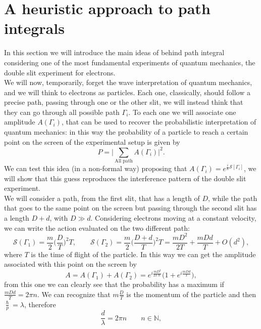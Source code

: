\section{A heuristic approach to path integrals}
In this section we will introduce the main ideas of behind path integral considering one of the most fundamental experiments of quantum mechanics, the double slit experiment for electrons.\\
We will now, temporarily, forget the wave interpretation of quantum mechanics, and we will think to electrons as particles. Each one, classically, should follow a precise path, passing through one or the other slit, we will instead think that they can go through all possible path $\Gamma_i$. To each one we will associate one amplitude $A(\Gamma_i)$, that can be used to recover the probabilistic interpretation of quantum mechanics: in this way the probability of a particle to reach a certain point on the screen of the experimental setup is given by 
\begin{equation*}
    P=\bigg|\sum_{\text{All path}}A(\Gamma_i)\bigg|^2.
\end{equation*}
We can test this idea (in a non-formal way) proposing that $A(\Gamma_i)=e^{\frac{i}{\hslash}\mathcal{S}[\Gamma_i]}$, we will show that this guess reproduces the interference pattern of the double slit experiment.\\
We will consider a path, from the first slit, that has a length of $D$, while the path that goes to the same point on the screen but passing through the second slit has a length $D+d$, with $D\gg d$. Considering electrons moving at a constant velocity, we can write the action evaluated on the two different path:
\begin{equation*}
    \mathcal{S} (\Gamma_1)=\frac{m}{2}\bigg(\frac{D}{T}\bigg)^2T,\qquad\mathcal{S} (\Gamma_2)=\frac{m}{2}\bigg(\frac{D+d}{T}\bigg)^2T=\frac{mD^2}{2T}+\frac{mDd}{T}+O(d^2),
\end{equation*}
where $T$ is the time of flight of the particle. In this way we can get the amplitude associated with this point on the screen by
\begin{equation*}
    A=A(\Gamma_1)+A(\Gamma_2)=e^{i\frac{mD^2}{2T\hslash}}\bigg(1+e^{i\frac{mDd}{T}}\bigg),
\end{equation*}
from this one we can clearly see that the probability has a maximum if $\frac{mDd}{T}=2\pi n$. We can recognize that $m\frac{D}{T}$ is the momentum of the particle and then $\frac{\hslash}{p}=\lambda$, therefore 
\begin{equation*}
    \frac{d}{\lambda}=2\pi n\qquad n\in\mathbb{N},
\end{equation*}
